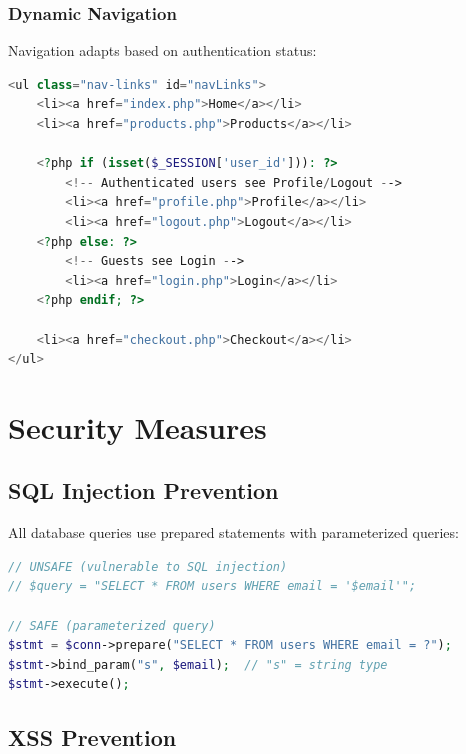 \documentclass[12pt,a4paper]{article}
\begin{document}
\subsubsection{Dynamic Navigation}

Navigation adapts based on authentication status:

\begin{lstlisting}[language=PHP, caption=Dynamic Navigation (PHP)]
<ul class="nav-links" id="navLinks">
    <li><a href="index.php">Home</a></li>
    <li><a href="products.php">Products</a></li>
    
    <?php if (isset($_SESSION['user_id'])): ?>
        <!-- Authenticated users see Profile/Logout -->
        <li><a href="profile.php">Profile</a></li>
        <li><a href="logout.php">Logout</a></li>
    <?php else: ?>
        <!-- Guests see Login -->
        <li><a href="login.php">Login</a></li>
    <?php endif; ?>
    
    <li><a href="checkout.php">Checkout</a></li>
</ul>
\end{lstlisting}

\section{Security Measures}

\subsection{SQL Injection Prevention}

All database queries use prepared statements with parameterized queries:

\begin{lstlisting}[language=PHP, caption=Prepared Statement Example]
// UNSAFE (vulnerable to SQL injection)
// $query = "SELECT * FROM users WHERE email = '$email'";

// SAFE (parameterized query)
$stmt = $conn->prepare("SELECT * FROM users WHERE email = ?");
$stmt->bind_param("s", $email);  // "s" = string type
$stmt->execute();
\end{lstlisting}

\subsection{XSS Prevention}
\end{document}

